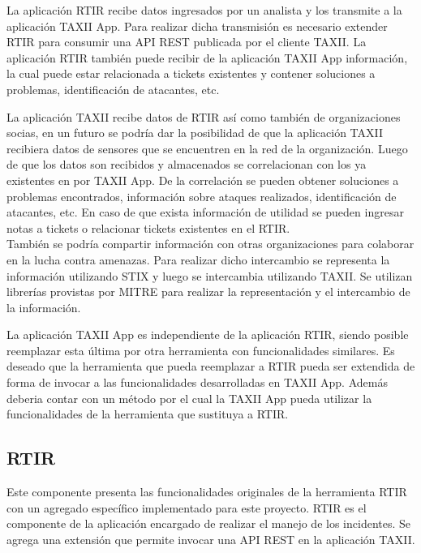 	La aplicación RTIR recibe datos ingresados por un analista y los transmite a la aplicación
		TAXII App. Para realizar dicha transmisión es necesario extender RTIR para consumir una API REST publicada por el
		cliente TAXII. La aplicación RTIR también puede recibir de la aplicación TAXII App información, la cual puede
		estar relacionada a tickets existentes y contener soluciones a problemas, identificación de atacantes, etc.
	
	
	\bigskip
	
	La aplicación TAXII recibe datos de RTIR así como también de organizaciones socias, en un
		futuro se podría dar la posibilidad de que la aplicación TAXII recibiera datos de sensores que se encuentren en la red
		de la organización. Luego de que los datos son recibidos y almacenados se correlacionan con los ya existentes en por TAXII App. De la
		correlación se pueden obtener soluciones a problemas encontrados, información sobre ataques realizados, identificación
		de atacantes, etc. En caso de que exista información de utilidad se pueden ingresar notas a tickets o relacionar
		tickets existentes en el RTIR.\\
		\bigskip
	También se podría compartir información con otras organizaciones para colaborar en la lucha
		contra amenazas. Para realizar dicho intercambio se representa la información utilizando STIX y luego se intercambia
		utilizando TAXII. Se utilizan librerías provistas por MITRE para realizar la representación y el intercambio de la
		información.
	
	
	\bigskip
	
	La aplicación TAXII App es independiente de la aplicación RTIR, siendo posible reemplazar esta
		última por otra herramienta con funcionalidades similares. Es deseado que la herramienta que pueda reemplazar a RTIR
		pueda ser extendida de forma de invocar a las funcionalidades desarrolladas en TAXII App. Además deberia contar con un método por el
		cual la TAXII App pueda utilizar la funcionalidades de la herramienta que sustituya a RTIR.
	
	\subsection{RTIR}
	Este componente presenta las funcionalidades originales de la herramienta RTIR con un agregado
		específico implementado para este proyecto. RTIR es el componente de la aplicación encargado de realizar el manejo de
		los incidentes. Se agrega una extensión que permite invocar una API REST en la aplicación TAXII.
	\bigskip
	
